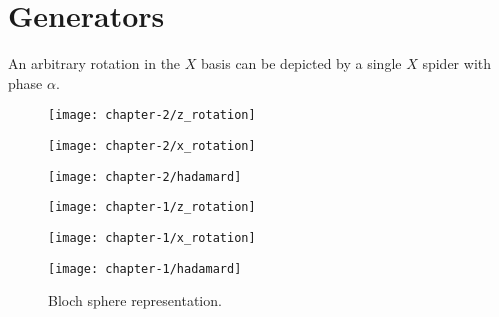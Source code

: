 \section{Generators}

An arbitrary rotation in the $X$ basis can be depicted by a single $X$ spider with phase $\alpha$.

\begin{figure}[H]
\centering
    \begin{minipage}{.3\textwidth}
      \centering
      \texttt{[image: chapter-2/z\_rotation]}
    \end{minipage}%
    \begin{minipage}{.3\textwidth}
      \centering
      \texttt{[image: chapter-2/x\_rotation]}
    \end{minipage}%
    \begin{minipage}{.3\textwidth}
      \centering
      \texttt{[image: chapter-2/hadamard]}
    \end{minipage}
    \begin{minipage}{.3\textwidth}
      \centering
      \texttt{[image: chapter-1/z\_rotation]}
    \end{minipage}
    \begin{minipage}{.3\textwidth}
      \centering
      \texttt{[image: chapter-1/x\_rotation]}
    \end{minipage}
    \begin{minipage}{.3\textwidth}
      \centering
      \texttt{[image: chapter-1/hadamard]}
    \end{minipage}
    \caption{Bloch sphere representation.}
\end{figure}

